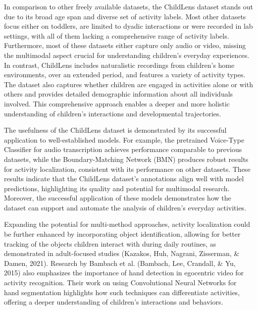 \documentclass[
  man,floatsintext]{apa6}
\begin{document}
In comparison to other freely available datasets, the ChildLens dataset stands out due to its broad age span and diverse set of activity labels. Most other datasets focus either on toddlers, are limited to dyadic interactions or were recorded in lab settings, with all of them lacking a comprehensive range of activity labels. Furthermore, most of these datasets either capture only audio or video, missing the multimodal aspect crucial for understanding children's everyday experiences. In contrast, ChildLens includes naturalistic recordings from children's home environments, over an extended period, and features a variety of activity types. The dataset also captures whether children are engaged in activities alone or with others and provides detailed demographic information about all individuals involved. This comprehensive approach enables a deeper and more holistic understanding of children's interactions and developmental trajectories.

The usefulness of the ChildLens dataset is demonstrated by its successful application to well-established models. For example, the pretrained Voice-Type Classifier for audio transcription achieves performance comparable to previous datasets, while the Boundary-Matching Network (BMN) produces robust results for activity localization, consistent with its performance on other datasets. These results indicate that the ChildLens dataset's annotations align well with model predictions, highlighting its quality and potential for multimodal research. Moreover, the successful application of these models demonstrates how the dataset can support and automate the analysis of children's everyday activities.

Expanding the potential for multi-method approaches, activity localization could be further enhanced by incorporating object identification, allowing for better tracking of the objects children interact with during daily routines, as demonstrated in adult-focused studies (Kazakos, Huh, Nagrani, Zisserman, \& Damen, 2021). Research by Bambach et al. (Bambach, Lee, Crandall, \& Yu, 2015) also emphasizes the importance of hand detection in egocentric video for activity recognition. Their work on using Convolutional Neural Networks for hand segmentation highlights how such techniques can differentiate activities, offering a deeper understanding of children's interactions and behaviors.
\end{document}
